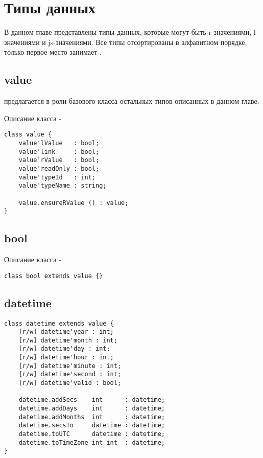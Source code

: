 \section{Типы данных}

В данном главе представлены типы данных, которые могут быть r-значениями, l-значениями и js-значениями. Все типы отсортированы в алфавитном порядке, только первое место занимает .

\subsection{{\color{lightblue} value}}

 предлагается в роли базового класса остальных типов описанных в данном главе.

\noindent Описание класса  -
\begin{lstlisting}[numbers=none]
class value {
    value'lValue   : bool;
    value'link     : bool;
    value'rValue   : bool;
    value'readOnly : bool;
    value'typeId   : int;
    value'typeName : string;

    value.ensureRValue () : value;
}
\end{lstlisting}

\subsection{{\color{lightblue} bool}}

\noindent Описание класса \bool -
\begin{lstlisting}[numbers=none]
class bool extends value {}
\end{lstlisting}

\subsection{{\color{lightblue} datetime}}

\begin{lstlisting}[numbers=none]
class datetime extends value {
	[r/w] datetime'year : int;
	[r/w] datetime'month : int;
	[r/w] datetime'day : int;
	[r/w] datetime'hour : int;
	[r/w] datetime'minute : int;
	[r/w] datetime'second : int;
	[r/w] datetime'valid : bool;
	
	datetime.addSecs    int      : datetime;
	datetime.addDays    int      : datetime;
	datetime.addMonths  int      : datetime;
	datetime.secsTo     datetime : datetime;
	datetime.toUTC      datetime : datetime;
	datetime.toTimeZone int int  : datetime;
}
\end{lstlisting}

